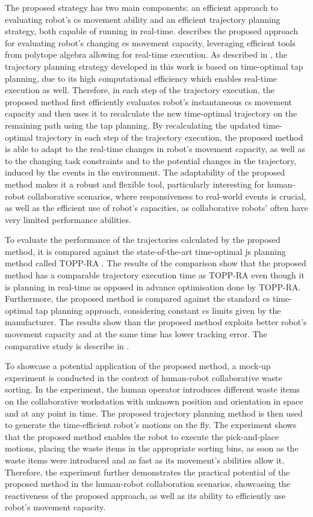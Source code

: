 The proposed strategy has two main components: an efficient approach to evaluating robot's \gls{cs} movement ability and an efficient trajectory planning strategy, both capable of running in real-time.  describes the proposed approach for evaluating robot's changing \gls{cs} movement capacity, leveraging efficient tools from polytope algebra allowing for real-time execution. As described in , the trajectory planning strategy developed in this work is based on time-optimal \gls{tap} planning, due to its high computational efficiency which enables real-time execution as well. Therefore, in each step of the trajectory execution, the proposed method first efficiently evaluates robot's instantaneous \gls{cs} movement capacity and then uses it to recalculate the new time-optimal trajectory on the remaining path using the \gls{tap} planning. 
By recalculating the updated time-optimal trajectory in each step of the trajectory execution, the proposed method is able to adapt to the real-time changes in robot's movement capacity, as well as to the changing task constraints and to the potential changes in the trajectory, induced by the events in the environment. 
The adaptability of the proposed method makes it a robust and flexible tool, particularly interesting for human-robot collaborative scenarios, where responsiveness to real-world events is crucial, as well as the efficient use of robot's capacities, as collaborative robots' often have very limited performance abilities. 

To evaluate the performance of the trajectories calculated by the proposed method, it is compared against the state-of-the-art time-optimal \gls{js} planning method called TOPP-RA \cite{Pham2018}. The results of the comparison show that the proposed method has a comparable trajectory execution time as TOPP-RA even though it is planning in real-time as opposed in advance optimisation done by TOPP-RA.
Furthermore, the proposed method is compared against the standard \gls{cs} time-optimal \gls{tap} planning approach, considering constant \gls{cs} limits given by the manufacturer. The results show than the proposed method exploits better robot's movement capacity and at the same time has lower tracking error. The comparative study is describe in .

To showcase a potential application of the proposed method, a mock-up experiment is conducted in the context of human-robot collaborative waste sorting. In the experiment, the human operator introduces different waste items on the collaborative workstation with unknown position and orientation in space and at any point in time. The proposed trajectory planning method is then used to generate the time-efficient robot's motions on the fly. The experiment shows that the proposed method enables the robot to execute the pick-and-place motions, placing the waste items in the appropriate sorting bins, as soon as the waste items were introduced and as fast as its movement's abilities allow it. Therefore, the experiment further demonstrates the practical potential of the proposed method in the human-robot collaboration scenarios, showcasing the reactiveness of the proposed approach, as well as its ability to efficiently use robot's movement capacity. 
